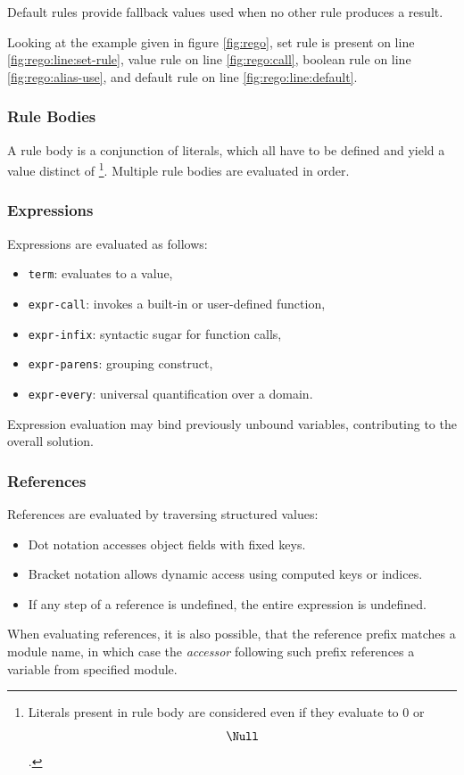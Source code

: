Default rules provide fallback values used when no other rule produces a result.

Looking at the example given in figure \ref{fig:rego}, set rule is present on line \ref{fig:rego:line:set-rule}, value rule on line \ref{fig:rego:call}, boolean rule on line \ref{fig:rego:alias-use}, and default rule on line \ref{fig:rego:line:default}.

\subsubsection{Rule Bodies}

A rule body is a conjunction of literals, which all have to be defined and yield a value distinct of \false\footnote{
  Literals present in rule body are considered \true even if they evaluate to $0$ or $$\Null$$.
}.
Multiple rule bodies are evaluated in order.

\subsubsection{Expressions}

Expressions are evaluated as follows:
\begin{itemize}
  \item \texttt{term}: evaluates to a value,
  \item \texttt{expr-call}: invokes a built-in or user-defined function,
  \item \texttt{expr-infix}: syntactic sugar for function calls,
  \item \texttt{expr-parens}: grouping construct,
  \item \texttt{expr-every}: universal quantification over a domain.
\end{itemize}

Expression evaluation may bind previously unbound variables, contributing to the overall solution.

\subsubsection{References}

References are evaluated by traversing structured values:
\begin{itemize}
  \item Dot notation accesses object fields with fixed keys.
  \item Bracket notation allows dynamic access using computed keys or indices.
  \item If any step of a reference is undefined, the entire expression is undefined.
\end{itemize}
When evaluating references, it is also possible, that the reference prefix matches a module name, in which case the \emph{accessor} following such prefix references a variable from specified module.

